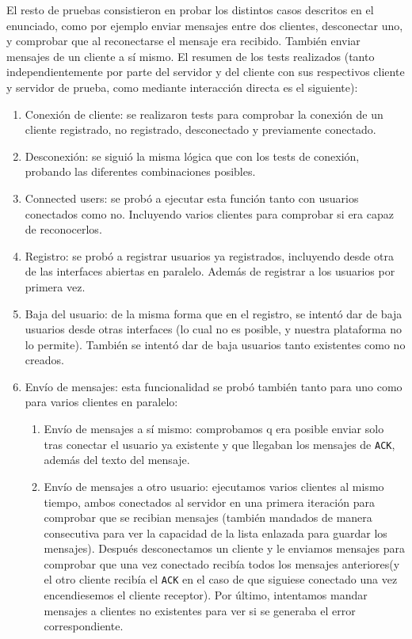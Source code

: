 El resto de pruebas consistieron en probar los distintos casos descritos en el enunciado, como por ejemplo enviar mensajes entre dos clientes, desconectar uno, y comprobar que al reconectarse el mensaje era recibido. También enviar mensajes de un cliente a sí mismo. El resumen de los tests realizados (tanto independientemente por parte del servidor y del cliente con sus respectivos cliente y servidor de prueba, como mediante interacción directa es el siguiente):
\begin{enumerate}
    \item Conexión de cliente: se realizaron tests para comprobar la conexión de un cliente registrado, no registrado, desconectado y previamente conectado.
    \item Desconexión: se siguió la misma lógica que con los tests de conexión, probando las diferentes combinaciones posibles.
    \item Connected users: se probó a ejecutar esta función tanto con usuarios conectados como no. Incluyendo varios clientes para comprobar si era capaz de reconocerlos.
    \item Registro: se probó a registrar usuarios ya registrados, incluyendo desde otra de las interfaces abiertas en paralelo. Además de registrar a los usuarios por primera vez.
    \item Baja del usuario: de la misma forma que en el registro, se intentó dar de baja usuarios desde otras interfaces (lo cual no es posible, y nuestra plataforma no lo permite). También se intentó dar de baja usuarios tanto existentes como no creados.
    \item Envío de mensajes: esta funcionalidad se probó también tanto para uno como para varios clientes en paralelo:
    \begin{enumerate}
        \item Envío de mensajes a sí mismo: comprobamos q era posible enviar solo tras conectar el usuario ya existente y que llegaban los mensajes de \texttt{ACK}, además del texto del mensaje.
        \item Envío de mensajes a otro usuario: ejecutamos varios clientes al mismo tiempo, ambos conectados al servidor en una primera iteración para comprobar que se recibian mensajes (también mandados de manera consecutiva para ver la capacidad de la lista enlazada para guardar los mensajes). Después desconectamos un cliente y le enviamos mensajes para comprobar que una vez conectado recibía todos los mensajes anteriores(y el otro cliente recibía el \texttt{ACK} en el caso de que siguiese conectado una vez encendiesemos el cliente receptor). Por último, intentamos mandar mensajes a clientes no existentes para ver si se generaba el error correspondiente.
    \end{enumerate}

\end{enumerate}